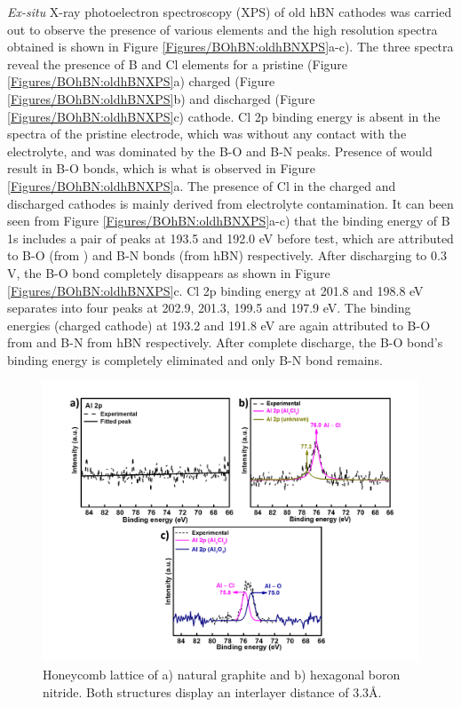 \textit{Ex-situ} X-ray photoelectron spectroscopy (XPS) of old hBN cathodes was carried out to observe the presence of various elements and the high resolution spectra obtained is shown in Figure \ref{Figures/BOhBN:oldhBNXPS}a-c). The three spectra reveal the presence of B and Cl elements for a pristine (Figure \ref{Figures/BOhBN:oldhBNXPS}a) charged (Figure \ref{Figures/BOhBN:oldhBNXPS}b) and discharged (Figure \ref{Figures/BOhBN:oldhBNXPS}c) cathode. Cl 2p binding energy is absent in the spectra of the pristine electrode, which was without any contact with the electrolyte, and was dominated by the B-O and B-N peaks. Presence of  would result in B-O bonds, which is what is observed in Figure \ref{Figures/BOhBN:oldhBNXPS}a. The presence of Cl in the charged and discharged cathodes is mainly derived from electrolyte contamination. It can been seen from Figure \ref{Figures/BOhBN:oldhBNXPS}a-c) that the binding energy of B 1s includes a pair of peaks at 193.5 and 192.0 eV before test, which are attributed to B-O (from ) and B-N bonds (from hBN) respectively. After discharging to 0.3 V, the B-O bond completely disappears as shown in Figure \ref{Figures/BOhBN:oldhBNXPS}c. Cl 2p binding energy at 201.8 and 198.8 eV separates into four peaks at 202.9, 201.3, 199.5 and 197.9 eV. The binding energies (charged cathode) at 193.2 and 191.8 eV are again attributed to B-O from  and B-N from hBN respectively. After complete discharge, the B-O bond's binding energy is completely eliminated and only B-N bond remains.

\begin{figure}[tbh!]
\centering
\includegraphics[width=\textwidth]{Figures/BOhBN/hBNAlXPS}
\caption{Honeycomb lattice of a) natural graphite and b) hexagonal boron nitride. Both structures display an interlayer distance of 3.3\AA.}
\label{Figures/BOhBN:hBNAlXPS}
\end{figure}

